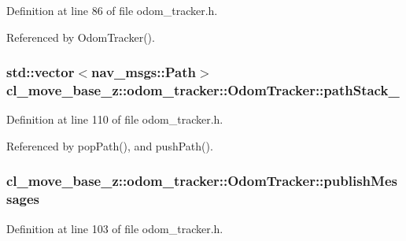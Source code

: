 Definition at line 86 of file odom\+\_\+tracker.\+h.



Referenced by Odom\+Tracker().

\subsubsection[{\texorpdfstring{path\+Stack\+\_\+}{pathStack_}}]{\setlength{\rightskip}{0pt plus 5cm}std\+::vector$<$nav\+\_\+msgs\+::\+Path$>$ cl\+\_\+move\+\_\+base\+\_\+z\+::odom\+\_\+tracker\+::\+Odom\+Tracker\+::path\+Stack\+\_\+\hspace{0.3cm}{\ttfamily [protected]}}\hypertarget{classcl__move__base__z_1_1odom__tracker_1_1OdomTracker_a1ccad1b568b6c65da43ba6639b6bd1ef}{}\label{classcl__move__base__z_1_1odom__tracker_1_1OdomTracker_a1ccad1b568b6c65da43ba6639b6bd1ef}


Definition at line 110 of file odom\+\_\+tracker.\+h.



Referenced by pop\+Path(), and push\+Path().

\subsubsection[{\texorpdfstring{publish\+Messages}{publishMessages}}]{ cl\+\_\+move\+\_\+base\+\_\+z\+::odom\+\_\+tracker\+::\+Odom\+Tracker\+::publish\+Messages\hspace{0.3cm}{\ttfamily [protected]}}\hypertarget{classcl__move__base__z_1_1odom__tracker_1_1OdomTracker_a4f253d45ab5750dee3c2f18dd5599725}{}\label{classcl__move__base__z_1_1odom__tracker_1_1OdomTracker_a4f253d45ab5750dee3c2f18dd5599725}


Definition at line 103 of file odom\+\_\+tracker.\+h.



